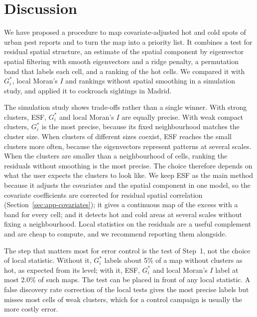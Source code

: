 \section{Discussion}\label{sec:conc}

We have proposed a procedure to map covariate-adjusted hot and cold spots of urban pest reports and to turn the map into a priority list. It combines a test for residual spatial structure, an estimate of the spatial component by eigenvector spatial filtering with smooth eigenvectors and a ridge penalty, a permutation band that labels each cell, and a ranking of the hot cells. We compared it with $G_i^*$, local Moran's $I$ and rankings without spatial smoothing in a simulation study, and applied it to cockroach sightings in Madrid.

The simulation study shows trade-offs rather than a single winner. With strong clusters, ESF, $G_i^*$ and local Moran's $I$ are equally precise. With weak compact clusters, $G_i^*$ is the most precise, because its fixed neighbourhood matches the cluster size. When clusters of different sizes coexist, ESF reaches the small clusters more often, because the eigenvectors represent patterns at several scales. When the clusters are smaller than a neighbourhood of cells, ranking the residuals without smoothing is the most precise. The choice therefore depends on what the user expects the clusters to look like. We keep ESF as the main method because it adjusts the covariates and the spatial component in one model, so the covariate coefficients are corrected for residual spatial correlation (Section~\ref{sec:app-covariates}); it gives a continuous map of the excess with a band for every cell; and it detects hot and cold areas at several scales without fixing a neighbourhood. Local statistics on the residuals are a useful complement and are cheap to compute, and we recommend reporting them alongside.

 The step that matters most for error control is the test of Step~1, not the choice of local statistic. Without it, $G_i^*$ labels about 5\% of a map without clusters as hot, as expected from its level; with it, ESF, $G_i^*$ and local Moran's $I$ label at most 2.0\% of such maps. The test can be placed in front of any local statistic. A false discovery rate correction of the local tests \citep{benjamini1995controlling} gives the most precise labels but misses most cells of weak clusters, which for a control campaign is usually the more costly error.

